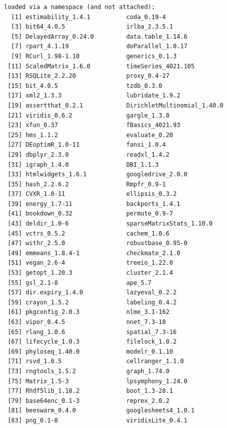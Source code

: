 \documentclass[
]{book}
\begin{document}
\begin{verbatim}
loaded via a namespace (and not attached):
  [1] estimability_1.4.1          coda_0.19-4                
  [3] bit64_4.0.5                 irlba_2.3.5.1              
  [5] DelayedArray_0.24.0         data.table_1.14.6          
  [7] rpart_4.1.19                doParallel_1.0.17          
  [9] RCurl_1.98-1.10             generics_0.1.3             
 [11] ScaledMatrix_1.6.0          timeSeries_4021.105        
 [13] RSQLite_2.2.20              proxy_0.4-27               
 [15] bit_4.0.5                   tzdb_0.3.0                 
 [17] xml2_1.3.3                  lubridate_1.9.2            
 [19] assertthat_0.2.1            DirichletMultinomial_1.40.0
 [21] viridis_0.6.2               gargle_1.3.0               
 [23] xfun_0.37                   fBasics_4021.93            
 [25] hms_1.1.2                   evaluate_0.20              
 [27] DEoptimR_1.0-11             fansi_1.0.4                
 [29] dbplyr_2.3.0                readxl_1.4.2               
 [31] igraph_1.4.0                DBI_1.1.3                  
 [33] htmlwidgets_1.6.1           googledrive_2.0.0          
 [35] hash_2.2.6.2                Rmpfr_0.9-1                
 [37] CVXR_1.0-11                 ellipsis_0.3.2             
 [39] energy_1.7-11               backports_1.4.1            
 [41] bookdown_0.32               permute_0.9-7              
 [43] deldir_1.0-6                sparseMatrixStats_1.10.0   
 [45] vctrs_0.5.2                 cachem_1.0.6               
 [47] withr_2.5.0                 robustbase_0.95-0          
 [49] emmeans_1.8.4-1             checkmate_2.1.0            
 [51] vegan_2.6-4                 treeio_1.22.0              
 [53] getopt_1.20.3               cluster_2.1.4              
 [55] gsl_2.1-8                   ape_5.7                    
 [57] dir.expiry_1.4.0            lazyeval_0.2.2             
 [59] crayon_1.5.2                labeling_0.4.2             
 [61] pkgconfig_2.0.3             nlme_3.1-162               
 [63] vipor_0.4.5                 nnet_7.3-18                
 [65] rlang_1.0.6                 spatial_7.3-16             
 [67] lifecycle_1.0.3             filelock_1.0.2             
 [69] phyloseq_1.40.0             modelr_0.1.10              
 [71] rsvd_1.0.5                  cellranger_1.1.0           
 [73] rngtools_1.5.2              graph_1.74.0               
 [75] Matrix_1.5-3                lpsymphony_1.24.0          
 [77] Rhdf5lib_1.18.2             boot_1.3-28.1              
 [79] base64enc_0.1-3             reprex_2.0.2               
 [81] beeswarm_0.4.0              googlesheets4_1.0.1        
 [83] png_0.1-8                   viridisLite_0.4.1          

\end{verbatim}
\end{document}
